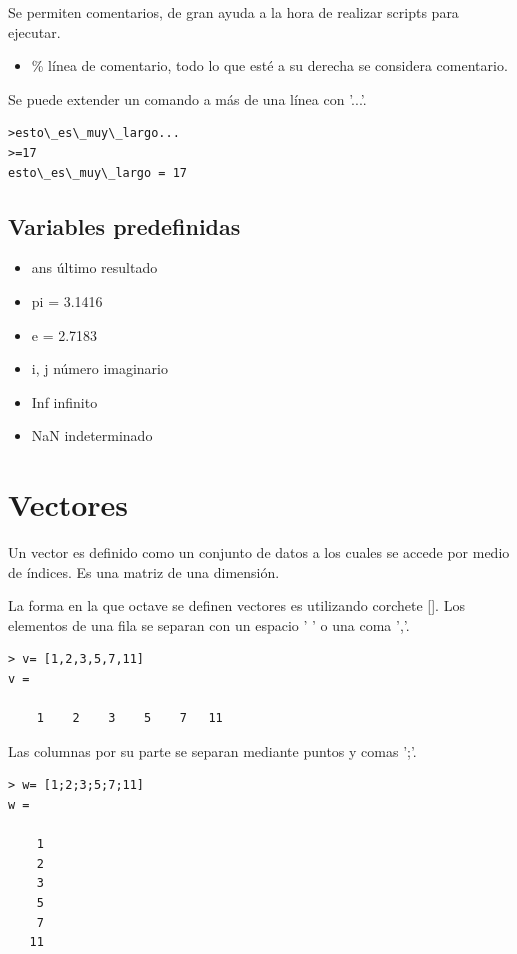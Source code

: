 \documentclass[a4,12pt,graphicx,caption,rotating]{article}
\begin{document}
Se permiten comentarios, de gran ayuda a la hora de realizar scripts para ejecutar.
\begin{itemize}
\item\% línea de comentario, todo lo que esté a su derecha se considera comentario.
\end{itemize}
Se puede extender un comando a más de una línea con '...'.
\begin{verbatim}
>esto\_es\_muy\_largo...
>=17
esto\_es\_muy\_largo = 17
\end{verbatim}
\subsection{Variables predefinidas}
\begin{itemize}
\item ans último resultado
\item pi = 3.1416
\item e = 2.7183
\item i, j número imaginario
\item Inf infinito
\item NaN indeterminado
\end{itemize}
\section{Vectores}
Un vector es definido como un conjunto de datos a los cuales se accede por medio de índices. Es una matriz de una dimensión.

La forma en la que octave se definen vectores es utilizando corchete []. Los elementos de una fila se separan con un espacio ' ' o una coma ','.
\begin{verbatim}
> v= [1,2,3,5,7,11]
v =

    1    2    3    5    7   11
\end{verbatim}
Las columnas por su parte se separan mediante puntos y comas ';'.
\begin{verbatim}
> w= [1;2;3;5;7;11]
w =

    1
    2
    3
    5
    7
   11
\end{verbatim}
\end{document}
